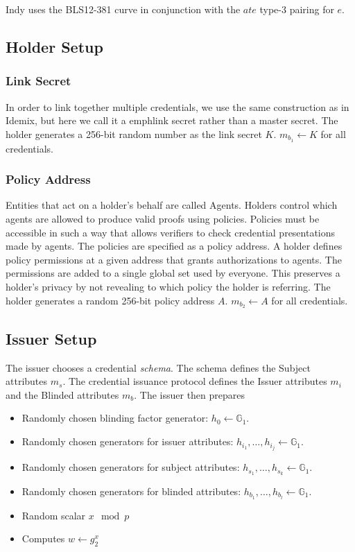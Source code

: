 \documentclass[a4paper]{article}
\begin{document}
Indy uses the BLS12-381 curve in conjunction with the $ate$ type-3 pairing for $e$.

\subsection{Holder Setup}
\subsubsection{Link Secret}
In order to link together multiple credentials, we use the same construction as in Idemix, but here we call it a emph{link secret} rather than a master secret.
The holder generates a 256-bit random number as the link secret $K$. $m_{b_1} \leftarrow K$ for all credentials.

\subsubsection{Policy Address}

Entities that act on a holder's behalf are called Agents. 
Holders control which agents are allowed to produce valid proofs using policies. Policies must be accessible in such a way that allows verifiers to check credential presentations made by agents. The policies are specified as a policy address. A holder defines policy permissions at a given address that grants authorizations to agents. The permissions are added to a single global set used by everyone. This preserves a holder's privacy by not revealing to which policy the holder is referring. 
The holder generates a random 256-bit policy address $A$. $m_{b_2} \leftarrow A$ for all credentials.

\subsection{Issuer Setup}

The issuer chooses a credential \emph{schema}. The schema defines the Subject attributes $m_s$. The credential issuance protocol defines the Issuer attributes $m_i$ and the Blinded attributes $m_b$. The issuer then prepares

\begin{itemize}
    \item Randomly chosen blinding factor generator: $h_0 \leftarrow \mathbb{G}_1$.
    \item Randomly chosen generators for issuer attributes: $h_{i_1},\ldots,h_{i_j} \leftarrow \mathbb{G}_1$.
    \item Randomly chosen generators for subject attributes: $h_{s_1},\ldots,h_{s_k} \leftarrow \mathbb{G}_1$.
    \item Randomly chosen generators for blinded attributes: $h_{b_1},\ldots,h_{b_l} \leftarrow \mathbb{G}_1$.
    \item Random scalar $x \mod p$
    \item Computes $w \leftarrow g_2^{x}$
\end{itemize}
\end{document}
